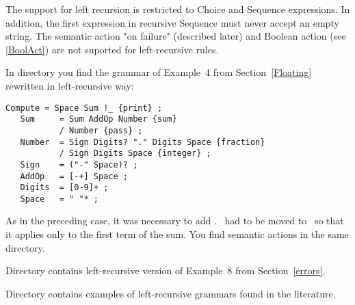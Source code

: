 The support for left recursion is restricted to Choice and Sequence expressions.
In addition, the first expression in recursive Sequence must never accept an empty string.
The semantic action "on failure" (described later) and Boolean action (see \ref{BoolAct})
are not suported for left-recursive rules.

In directory  you find the grammar of Example~4 from Section~\ref{Floating}
rewritten in left-recursive way:
\smallskip 
\small
\begin{Verbatim}[frame=single,framesep=2mm,samepage=true,xleftmargin=15mm,xrightmargin=15mm,baselinestretch=0.8]
   Compute = Space Sum !_ {print} ; 
   Sum     = Sum AddOp Number {sum}
           / Number {pass} ;
   Number  = Sign Digits? "." Digits Space {fraction}
           / Sign Digits Space {integer} ; 
   Sign    = ("-" Space)? ;
   AddOp   = [-+] Space ;
   Digits  = [0-9]+ ;
   Space   = " "* ;
\end{Verbatim}
\normalsize

As in the preceding case, it was necessary to add \Compute.
\Sign\ had to be moved to \Number\
so that it applies only to the first term of the sum.
You find semantic actions in the same directory.

Directory  contains left-recursive version of Example~8 from Section~\ref{errors}. 

Directory  contains examples of left-recursive grammars found in the literature.




